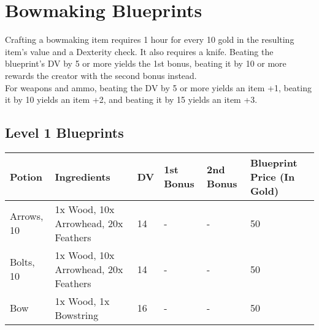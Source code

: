 \section{Bowmaking Blueprints}\label{sec:bowmakingBlueprints}
Crafting a bowmaking item requires 1 hour for every 10 gold in the resulting item's value and a Dexterity check.
It also requires a knife.
Beating the blueprint's DV by 5 or more yields the 1st bonus, beating it by 10 or more rewards the creator with the second bonus instead.\\
For weapons and ammo, beating the DV by 5 or more yields an item +1, beating it by 10 yields an item +2, and beating it by 15 yields an item +3.\\


\subsection{Level 1 Blueprints}
\begin{longtable}{l | p{2.5cm} | l | p{1.5cm} | p{1.5cm} | p{1cm} }
	Potion & Ingredients & DV & 1st Bonus & 2nd Bonus & Blueprint Price (In Gold)\\ \hline
	Arrows, 10 & 1x Wood, 10x Arrowhead, 20x Feathers & 14 & - & - & 50\\
	Bolts, 10 & 1x Wood, 10x Arrowhead, 20x Feathers & 14 & - & - & 50\\
	Bow & 1x Wood, 1x Bowstring & 16 & - & - & 50\\
\end{longtable}